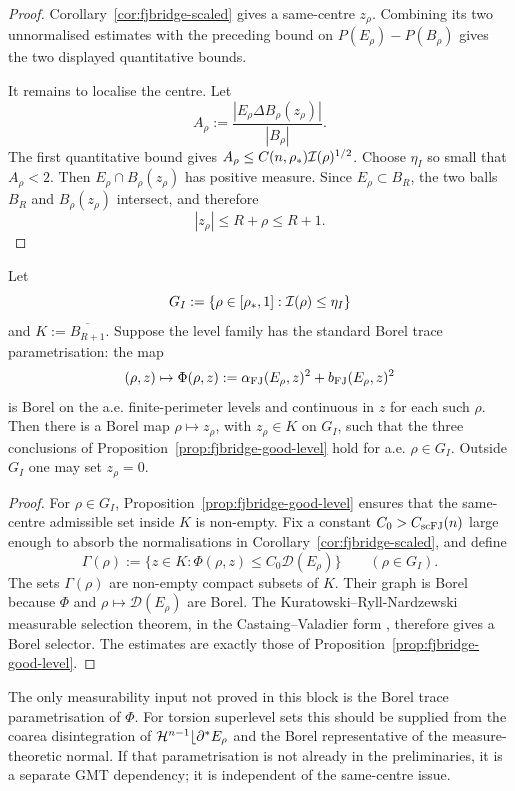 \begin{proof}
Corollary~\ref{cor:fjbridge-scaled} gives a same-centre \(z_\rho\).
Combining its two unnormalised estimates with the preceding bound on
\(P(E_\rho)-P(B_\rho)\) gives the two displayed quantitative bounds.

It remains to localise the centre.  Let
\[
   A_\rho:=
   \frac{|E_\rho\Delta B_\rho(z_\rho)|}{|B_\rho|}.
\]
The first quantitative bound gives \(A_\rho\le C(n,\rho_*)
\mathcal I(\rho)^{1/2}\).  Choose \(\eta_I\) so small that
\(A_\rho<2\).  Then \(E_\rho\cap B_\rho(z_\rho)\) has positive measure.
Since \(E_\rho\subset B_R\), the two balls \(B_R\) and
\(B_\rho(z_\rho)\) intersect, and therefore
\[
   |z_\rho|\le R+\rho\le R+1.
\]
\end{proof}

\begin{proposition}
\label{prop:fjbridge-measurable-selection}
Let
\[
   G_I:=\{\rho\in[\rho_*,1]:\mathcal I(\rho)\le\eta_I\}
\]
and \(K:=\overline{B_{R+1}}\).  Suppose the level family has the
standard Borel trace parametrisation: the map
\[
   (\rho,z)\mapsto
   \Phi(\rho,z):=
   \alpha_{\rm FJ}(E_\rho,z)^2+b_{\rm FJ}(E_\rho,z)^2
\]
is Borel on the a.e. finite-perimeter levels and continuous in \(z\)
for each such \(\rho\).  Then there is a Borel map
\(\rho\mapsto z_\rho\), with \(z_\rho\in K\) on \(G_I\), such that the
three conclusions of Proposition~\ref{prop:fjbridge-good-level} hold
for a.e. \(\rho\in G_I\).  Outside \(G_I\) one may set \(z_\rho=0\).
\end{proposition}

\begin{proof}
For \(\rho\in G_I\), Proposition~\ref{prop:fjbridge-good-level}
ensures that the same-centre admissible set inside \(K\) is non-empty.
Fix a constant \(C_0>C_{\rm scFJ}(n)\) large enough to absorb the
normalisations in Corollary~\ref{cor:fjbridge-scaled}, and define
\[
   \Gamma(\rho):=
   \{z\in K:\Phi(\rho,z)\le C_0\mathcal D(E_\rho)\}
   \qquad(\rho\in G_I).
\]
The sets \(\Gamma(\rho)\) are non-empty compact subsets of \(K\).  Their
graph is Borel because \(\Phi\) and \(\rho\mapsto\mathcal D(E_\rho)\)
are Borel.  The Kuratowski--Ryll-Nardzewski measurable selection
theorem, in the Castaing--Valadier form \cite[Thm.~III.6]{CastaingValadier1977},
therefore gives a Borel selector.  The estimates are exactly those of
Proposition~\ref{prop:fjbridge-good-level}.
\end{proof}

\begin{remark}
\label{rem:fjbridge-trace-param-dependency}
The only measurability input not proved in this block is the Borel
trace parametrisation of \(\Phi\).  For torsion superlevel sets this
should be supplied from the coarea disintegration of
\(\mathcal H^{n-1}\lfloor\partial^*E_\rho\) and the Borel representative of the
measure-theoretic normal.  If that parametrisation is not already in
the preliminaries, it is a separate GMT dependency; it is independent
of the same-centre issue.
\end{remark}

